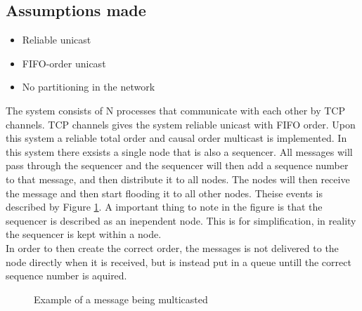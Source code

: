 \documentclass{article}
\begin{document}
  \subsection{Assumptions made}
  \label{assumption}
  \begin{itemize}
  \item Reliable unicast
  \item FIFO-order unicast
  \item No partitioning in the network
  \end{itemize}
  The system consists of N processes that communicate with each other by TCP channels.
  TCP channels gives the system reliable unicast with FIFO order. Upon this system a 
  reliable total order and causal order multicast is implemented. In this system there
  exsists a single node that is also a sequencer. All messages will pass through the sequencer
  and the sequencer will then add a sequence number to that message, and then distribute it to 
  all nodes. The nodes will then receive the message and then start flooding it to all other nodes.
  Theise events is described by Figure \ref{fig1}. A important thing to note in the figure is that
  the sequencer is described as an inependent node. This is for simplification, in reality the sequencer
  is kept within a node. \\
  In order to then create the correct order, the messages is not delivered to the node directly when
  it is received, but is instead put in a queue untill the correct sequence number is aquired.\\
  \begin{figure}[h]
    \centering
    \caption{Example of a message being multicasted}
    \label{fig1}
  \end{figure}
\end{document}

